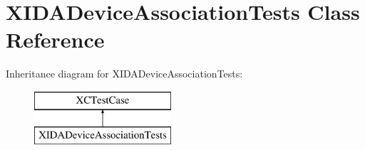 \hypertarget{interface_x_i_d_a_device_association_tests}{}\section{X\+I\+D\+A\+Device\+Association\+Tests Class Reference}
\label{interface_x_i_d_a_device_association_tests}
Inheritance diagram for X\+I\+D\+A\+Device\+Association\+Tests\+:\begin{figure}[H]
\begin{center}
\leavevmode
\includegraphics[height=2.000000cm]{interface_x_i_d_a_device_association_tests}
\end{center}
\end{figure}
